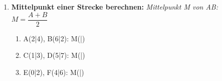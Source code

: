 \begin{enumerate}[label=\arabic*.]
    \vspace{1cm}

    \item \textbf{Mittelpunkt einer Strecke berechnen:}
    \textit{Mittelpunkt M von AB: $M = \dfrac{A + B}{2}$}
    \vspace{0.5cm}

    \begin{enumerate}[label=\alph*)]
        \item A(2|4), B(6|2): M(\underline{\hspace{1cm}}|\underline{\hspace{1cm}})
        \vspace{0.5cm}

        \item C(1|3), D(5|7): M(\underline{\hspace{1cm}}|\underline{\hspace{1cm}})
        \vspace{0.5cm}

        \item E(0|2), F(4|6): M(\underline{\hspace{1cm}}|\underline{\hspace{1cm}})
    \end{enumerate}

\end{enumerate}